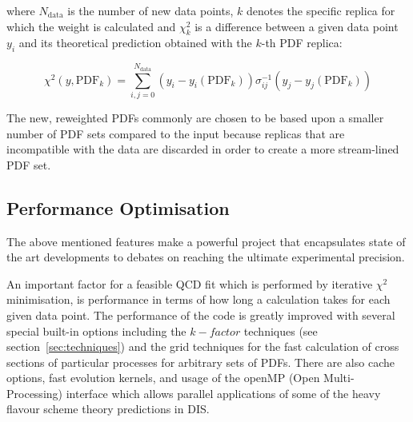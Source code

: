 where $N_{\mathrm{data}}$ is the number of new data points, $k$ denotes the specific replica for which the weight is calculated 
and $\chi^2_k$ is a difference between a given data point $y_i$ and its theoretical prediction obtained with the $k$-th PDF replica:

\begin{equation}
 \chi^2 (y,\mathrm{PDF}_k) = \sum_{i,j=0}^{N_{\mathrm{data}}} (y_i - y_i(\mathrm{PDF}_k)) \sigma^{-1}_{ij} (y_j-y_j(\mathrm{PDF}_k))  
\end{equation}

The new, reweighted PDFs commonly are chosen to be based upon a smaller number of PDF sets compared to the input because replicas 
that are incompatible with the data are discarded in order to create a more stream-lined PDF set.



\subsection{Performance Optimisation}

The above mentioned features make \fitter a powerful project that encapsulates 
state of the art developments 
to debates on reaching the ultimate experimental precision. 

An important factor for a feasible QCD fit which is performed by iterative 
$\chi^2$ minimisation, is performance in terms of how long a calculation takes for each given data point.
The performance of the \fitter  code is greatly improved with several special built-in options
including the $k-factor$ techniques (see section~\ref{sec:techniques}) and the grid techniques for the fast calculation of cross 
sections of particular processes for arbitrary sets of PDFs. There are also cache options, fast evolution kernels, and 
usage of the openMP (Open Multi-Processing) interface which allows
parallel applications of some of the heavy flavour scheme theory predictions in DIS. 






